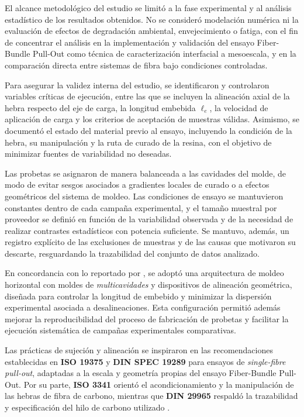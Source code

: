 El alcance metodológico del estudio se limitó a la fase experimental y al análisis estadístico
de los resultados obtenidos. No se consideró modelación numérica ni la evaluación de efectos de
degradación ambiental, envejecimiento o fatiga, con el fin de concentrar el análisis en la
implementación y validación del ensayo Fiber-Bundle Pull-Out como técnica de caracterización
interfacial a mesoescala, y en la comparación directa entre sistemas de fibra bajo condiciones
controladas.

Para asegurar la validez interna del estudio, se identificaron y controlaron variables críticas
de ejecución, entre las que se incluyen la alineación axial de la hebra respecto del eje de
carga, la longitud embebida \(\ell_e\), la velocidad de aplicación de carga y los criterios de
aceptación de muestras válidas. Asimismo, se documentó el estado del material previo al ensayo,
incluyendo la condición de la hebra, su manipulación y la ruta de curado de la resina, con el
objetivo de minimizar fuentes de variabilidad no deseadas.

Las probetas se asignaron de manera balanceada a las cavidades del molde, de modo de evitar
sesgos asociados a gradientes locales de curado o a efectos geométricos del sistema de moldeo.
Las condiciones de ensayo se mantuvieron constantes dentro de cada campaña experimental, y el
tamaño muestral por proveedor se definió en función de la variabilidad observada y de la
necesidad de realizar contrastes estadísticos con potencia suficiente. Se mantuvo, además, un
registro explícito de las exclusiones de muestras y de las causas que motivaron su descarte,
resguardando la trazabilidad del conjunto de datos analizado.

En concordancia con lo reportado por \cite{DeLeon2022}, se adoptó una arquitectura de moldeo
horizontal con moldes de \emph{multicavidades} y dispositivos de alineación geométrica, diseñada
para controlar la longitud de embebido y minimizar la dispersión experimental asociada a
desalineaciones. Esta configuración permitió además mejorar la reproducibilidad del proceso
de fabricación de probetas y facilitar la ejecución sistemática de campañas experimentales
comparativas.

Las prácticas de sujeción y alineación se inspiraron en las recomendaciones establecidas en
\textbf{ISO 19375} y \textbf{DIN SPEC 19289} para ensayos de \textit{single-fibre pull-out},
adaptadas a la escala y geometría propias del ensayo Fiber-Bundle Pull-Out. Por su parte,
\textbf{ISO 3341} orientó el acondicionamiento y la manipulación de las hebras de fibra de
carbono, mientras que \textbf{DIN 29965} respaldó la trazabilidad y especificación del hilo de
carbono utilizado \cite{ISO19375, DINSPEC19289, ISO3341, DIN29965}.

